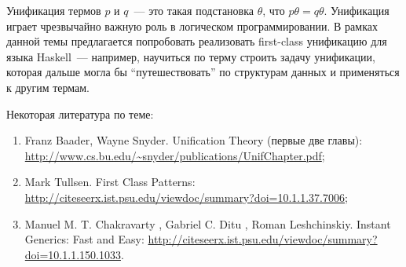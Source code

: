 \documentclass{article}
\begin{document}
Унификация термов $p$ и $q$~--- это такая подстановка $\theta$, что $p\theta=q\theta$. Унификация играет
чрезвычайно важную роль в логическом программировании. В рамках данной темы предлагается
попробовать реализовать first-class унификацию для языка Haskell~--- например, научиться по терму
строить задачу унификации, которая дальше могла бы ``путешествовать'' по структурам данных и 
применяться к другим термам.

Некоторая литература по теме:

\begin{enumerate}
\item Franz Baader, Wayne Snyder. Unification Theory (первые две главы): \url{http://www.cs.bu.edu/~snyder/publications/UnifChapter.pdf};
\item Mark Tullsen. First Class Patterns: \url{http://citeseerx.ist.psu.edu/viewdoc/summary?doi=10.1.1.37.7006};
\item Manuel M. T. Chakravarty , Gabriel C. Ditu , Roman Leshchinskiy. Instant Generics: Fast and Easy: \url{http://citeseerx.ist.psu.edu/viewdoc/summary?doi=10.1.1.150.1033}.
\end{enumerate}
\end{document}
